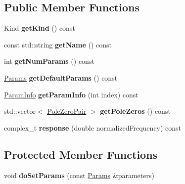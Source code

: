 \subsection*{Public Member Functions}
\begin{DoxyCompactItemize}
\item 
\hypertarget{classDsp_1_1FilterDesignBase_aab14d53e6631bedf609747581a18a5a6}{Kind {\bfseries get\-Kind} () const }\label{classDsp_1_1FilterDesignBase_aab14d53e6631bedf609747581a18a5a6}

\item 
\hypertarget{classDsp_1_1FilterDesignBase_ab2f803d964abffde2b1facb83dc22d11}{const std\-::string {\bfseries get\-Name} () const }\label{classDsp_1_1FilterDesignBase_ab2f803d964abffde2b1facb83dc22d11}

\item 
\hypertarget{classDsp_1_1FilterDesignBase_af8fc594b3f6799abb2bb41b54f97e399}{int {\bfseries get\-Num\-Params} () const }\label{classDsp_1_1FilterDesignBase_af8fc594b3f6799abb2bb41b54f97e399}

\item 
\hypertarget{classDsp_1_1FilterDesignBase_af5dc03f5d62c0c7eb0e9afef1f79f9e7}{\hyperlink{structDsp_1_1Params}{Params} {\bfseries get\-Default\-Params} () const }\label{classDsp_1_1FilterDesignBase_af5dc03f5d62c0c7eb0e9afef1f79f9e7}

\item 
\hypertarget{classDsp_1_1FilterDesignBase_ac87c7a62a5e275b07d1d9f7fd3bc3e93}{\hyperlink{classDsp_1_1ParamInfo}{Param\-Info} {\bfseries get\-Param\-Info} (int index) const }\label{classDsp_1_1FilterDesignBase_ac87c7a62a5e275b07d1d9f7fd3bc3e93}

\item 
\hypertarget{classDsp_1_1FilterDesignBase_aafc9fe97d233f77a5cc9f876a31d82b8}{std\-::vector$<$ \hyperlink{structDsp_1_1PoleZeroPair}{Pole\-Zero\-Pair} $>$ {\bfseries get\-Pole\-Zeros} () const }\label{classDsp_1_1FilterDesignBase_aafc9fe97d233f77a5cc9f876a31d82b8}

\item 
\hypertarget{classDsp_1_1FilterDesignBase_a93f10273913cffeff1a32217134bcd4b}{complex\-\_\-t {\bfseries response} (double normalized\-Frequency) const }\label{classDsp_1_1FilterDesignBase_a93f10273913cffeff1a32217134bcd4b}

\end{DoxyCompactItemize}
\subsection*{Protected Member Functions}
\begin{DoxyCompactItemize}
\item 
\hypertarget{classDsp_1_1FilterDesignBase_a868292b919465db6dcc63b7e004b34b8}{void {\bfseries do\-Set\-Params} (const \hyperlink{structDsp_1_1Params}{Params} \&parameters)}\label{classDsp_1_1FilterDesignBase_a868292b919465db6dcc63b7e004b34b8}

\end{DoxyCompactItemize}
